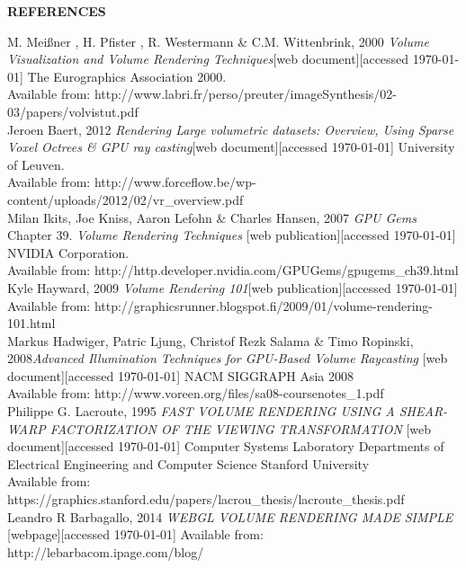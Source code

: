 \documentclass[twoside, english, 11pt]{report}
\begin{document}
\newpage

\LARGE \textbf{REFERENCES}\\

\small M. Meißner , H. Pfister , R. Westermann \& C.M. Wittenbrink, 2000 \textit{Volume Visualization and Volume Rendering Techniques}[web document][accessed \today] The Eurographics Association 2000.\\
Available from: http://www.labri.fr/perso/preuter/imageSynthesis/02-03/papers/volvistut.pdf\\

\small Jeroen Baert, 2012 \textit{Rendering Large volumetric datasets: Overview, Using Sparse Voxel Octrees \& GPU ray casting}[web document][accessed \today] University of Leuven.\\
Available from: http://www.forceflow.be/wp-content/uploads/2012/02/vr\_overview.pdf\\

\small Milan Ikits, Joe Kniss, Aaron Lefohn \& Charles Hansen, 2007 \textit{GPU Gems} Chapter 39. \textit{Volume Rendering Techniques} [web publication][accessed \today] NVIDIA Corporation.\\
Available from: http://http.developer.nvidia.com/GPUGems/gpugems\_ch39.html\\

\small Kyle Hayward, 2009 \textit{Volume Rendering 101}[web publication][accessed \today]
Available from: http://graphicsrunner.blogspot.fi/2009/01/volume-rendering-101.html\\

\small Markus Hadwiger, Patric Ljung, Christof Rezk Salama \& Timo Ropinski, 2008\textit{Advanced Illumination Techniques for GPU-Based Volume Raycasting} [web document][accessed \today] NACM SIGGRAPH Asia 2008 \\
Available from: http://www.voreen.org/files/sa08-coursenotes\_1.pdf\\

\small Philippe G. Lacroute, 1995 \textit{FAST VOLUME RENDERING USING A SHEAR-WARP FACTORIZATION OF THE VIEWING TRANSFORMATION} [web document][accessed \today] Computer Systems Laboratory
Departments of Electrical Engineering and Computer Science Stanford University \\
Available from: https://graphics.stanford.edu/papers/lacrou\_thesis/lacroute\_thesis.pdf\\

\small Leandro R Barbagallo, 2014 \textit{WEBGL VOLUME RENDERING MADE SIMPLE} [webpage][accessed \today] 
Available from: http://lebarbacom.ipage.com/blog/\\
\end{document}
